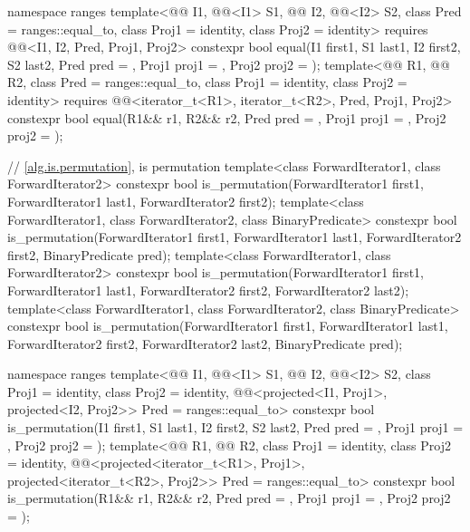 \begin{codeblock}
{  namespace ranges {
    template<@@ I1, @@<I1> S1, @@ I2, @@<I2> S2,
             class Pred = ranges::equal_to, class Proj1 = identity, class Proj2 = identity>
      requires @@<I1, I2, Pred, Proj1, Proj2>
      constexpr bool equal(I1 first1, S1 last1, I2 first2, S2 last2,
                           Pred pred = {},
                           Proj1 proj1 = {}, Proj2 proj2 = {});
    template<@@ R1, @@ R2, class Pred = ranges::equal_to,
             class Proj1 = identity, class Proj2 = identity>
      requires @@<iterator_t<R1>, iterator_t<R2>, Pred, Proj1, Proj2>
      constexpr bool equal(R1&& r1, R2&& r2, Pred pred = {},
                           Proj1 proj1 = {}, Proj2 proj2 = {});
  }

  // \ref{alg.is.permutation}, is permutation
  template<class ForwardIterator1, class ForwardIterator2>
    constexpr bool is_permutation(ForwardIterator1 first1, ForwardIterator1 last1,
                                  ForwardIterator2 first2);
  template<class ForwardIterator1, class ForwardIterator2, class BinaryPredicate>
    constexpr bool is_permutation(ForwardIterator1 first1, ForwardIterator1 last1,
                                  ForwardIterator2 first2, BinaryPredicate pred);
  template<class ForwardIterator1, class ForwardIterator2>
    constexpr bool is_permutation(ForwardIterator1 first1, ForwardIterator1 last1,
                                  ForwardIterator2 first2, ForwardIterator2 last2);
  template<class ForwardIterator1, class ForwardIterator2, class BinaryPredicate>
    constexpr bool is_permutation(ForwardIterator1 first1, ForwardIterator1 last1,
                                  ForwardIterator2 first2, ForwardIterator2 last2,
                                  BinaryPredicate pred);

  namespace ranges {
    template<@@ I1, @@<I1> S1, @@ I2,
             @@<I2> S2, class Proj1 = identity, class Proj2 = identity,
             @@<projected<I1, Proj1>,
                                           projected<I2, Proj2>> Pred = ranges::equal_to>
      constexpr bool is_permutation(I1 first1, S1 last1, I2 first2, S2 last2,
                                    Pred pred = {},
                                    Proj1 proj1 = {}, Proj2 proj2 = {});
    template<@@ R1, @@ R2,
             class Proj1 = identity, class Proj2 = identity,
             @@<projected<iterator_t<R1>, Proj1>,
                                           projected<iterator_t<R2>, Proj2>>
                                           Pred = ranges::equal_to>
      constexpr bool is_permutation(R1&& r1, R2&& r2, Pred pred = {},
                                    Proj1 proj1 = {}, Proj2 proj2 = {});
  }

}
\end{codeblock}
